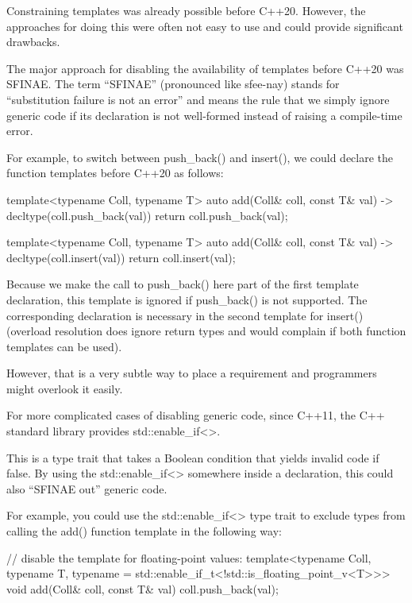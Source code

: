 
Constraining templates was already possible before C++20. However, the approaches for doing this were often not easy to use and could provide significant drawbacks.


The major approach for disabling the availability of templates before C++20 was SFINAE. The term “SFINAE” (pronounced like sfee-nay) stands for “substitution failure is not an error” and means the rule that we simply ignore generic code if its declaration is not well-formed instead of raising a compile-time error.

For example, to switch between push\_back() and insert(), we could declare the function templates before C++20 as follows:

\begin{cpp}
template<typename Coll, typename T>
auto add(Coll& coll, const T& val) -> decltype(coll.push_back(val))
{
	return coll.push_back(val);
}

template<typename Coll, typename T>
auto add(Coll& coll, const T& val) -> decltype(coll.insert(val))
{
	return coll.insert(val);
}
\end{cpp}

Because we make the call to push\_back() here part of the first template declaration, this template is ignored if push\_back() is not supported. The corresponding declaration is necessary in the second template for insert() (overload resolution does ignore return types and would complain if both function templates can be used).

However, that is a very subtle way to place a requirement and programmers might overlook it easily.


For more complicated cases of disabling generic code, since C++11, the C++ standard library provides std::enable\_if<>.

This is a type trait that takes a Boolean condition that yields invalid code if false. By using the std::enable\_if<> somewhere inside a declaration, this could also “SFINAE out” generic code.

For example, you could use the std::enable\_if<> type trait to exclude types from calling the add() function template in the following way:

\begin{cpp}
// disable the template for floating-point values:
template<typename Coll, typename T,
typename = std::enable_if_t<!std::is_floating_point_v<T>>>
void add(Coll& coll, const T& val)
{
	coll.push_back(val);
}
\end{cpp}

